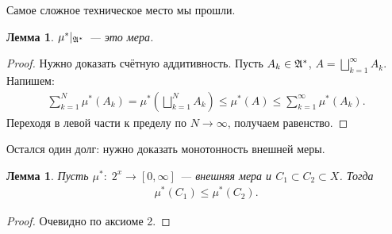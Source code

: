 \documentclass[a4paper,14pt]{extarticle}
\newcounter{theoremCnt}
\theoremstyle{definition}
\theoremstyle{plain}
\theoremstyle{plain}
\newtheorem{lm}[theoremCnt]{Лемма}
\theoremstyle{plain}
\theoremstyle{plain}
\theoremstyle{definition}
\theoremstyle{definition}
\theoremstyle{definition}
\theoremstyle{definition}
\theoremstyle{definition}
\theoremstyle{definition}
\theoremstyle{plain}
\theoremstyle{plain}
\theoremstyle{plain}
\theoremstyle{plain}
\theoremstyle{definition}
\theoremstyle{definition}
\theoremstyle{definition}
\theoremstyle{definition}
\theoremstyle{definition}
\newcommand{\A}{\ensuremath \mathfrak{A}}
\begin{document}
Самое сложное техническое место мы прошли.
\begin{lm}
 $ \mu^\ast \rvert_{\A^\ast} $ --- это мера.
\end{lm}
\begin{proof}
 Нужно доказать счётную аддитивность. Пусть $ A_k \in \A^\ast $, $ A = \bigsqcup_{k=1}^\infty A_k $. Напишем:
 \begin{align*}
  \sum_{k=1}^{N} \mu^\ast(A_k) = \mu^\ast\left( \bigsqcup_{k=1}^N A_k \right) \leqslant \mu^\ast(A) \leqslant \sum_{k=1}^{\infty}  \mu^\ast(A_k)
 .\end{align*} Переходя в левой части к пределу по $ N \to \infty $, получаем равенство.
\end{proof}
Остался один долг: нужно доказать монотонность внешней меры.
\begin{lm}
 Пусть $ \mu^\ast \colon\; 2^x \to [0, \infty] $ --- внешняя мера и $ C_1 \subset C_2 \subset X $. Тогда
 \begin{align*}
  \mu^\ast(C_1) \leqslant \mu^\ast(C_2)
 .\end{align*}
\end{lm}
\begin{proof}
 Очевидно по аксиоме 2.
\end{proof}
\end{document}
